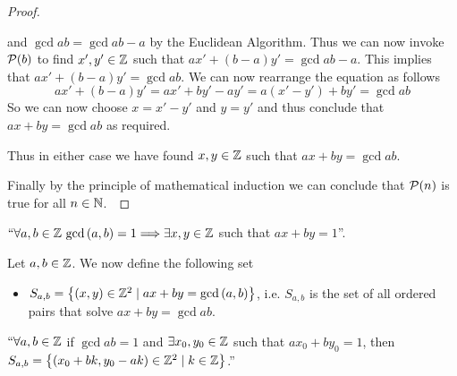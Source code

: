 \begin{proof}
\begin{itemize}
\begin{itemize}
                            and $\gcd{a}{b} = \gcd{a}{b - a}$ by the Euclidean Algorithm. Thus we can now invoke
                            $\mathcal{P}(b)$ to find $x', y' \in \mathbb{Z}$ such that 
                            $ax' + (b - a)y' = \gcd{a}{b - a}$.
                            This implies that $ax' + (b - a)y' = \gcd{a}{b}$. We can now rearrange the equation
                            as follows
                            \[
                                ax' + (b - a)y' = ax' + by' - ay' = a(x' - y') + by' = \gcd{a}{b}
                            \]
                            So we can now choose $x = x' - y'$ and $y = y'$ and thus conclude that 
                            $ax + by = \gcd{a}{b}$ as required.
                    \end{itemize}
                    Thus in either case we have found $x, y \in \mathbb{Z}$ such that $ax + by = \gcd{a}{b}$.
            \end{itemize}
            Finally by the principle of mathematical induction we can conclude that $\mathcal{P}(n)$ is
            true for all $n \in \mathbb{N}$.~\QED
        \end{proof}
        \begin{corollary}
            $``\forall a, b \in \mathbb{Z} \ \mathrm{gcd}\left(a, b\right) = 1 \Longrightarrow \exists x, y \in \mathbb{Z}$ such
            that $ax + by = 1$''.
            \label{diophantine inverse}
        \end{corollary}
        \begin{definition}
            Let $a, b \in \mathbb{Z}$. We now define the following set
            \begin{itemize}
                \item
                    $S_{a, b} = \left\{(x, y) \in \mathbb{Z}^2 \mid ax + by = \mathrm{gcd}\left(a, b\right)\right\}$, i.e. $S_{a, b}$ is
                    the set of all ordered pairs that solve $ax + by = \gcd{a}{b}$.
            \end{itemize}
        \end{definition}
        \begin{lemma}
            $``\forall a, b \in \mathbb{Z}$ if $\gcd{a}{b} = 1$ and $\exists x_0, y_0 \in \mathbb{Z}$
            such that $ax_0 + by_0 = 1$, then 
            $S_{a, b} = \left\{(x_0 + bk, y_0 - ak) \in \mathbb{Z}^2 \mid k \in \mathbb{Z}\right\}$.''
            \label{Linear Diophantine Equations All Solutions Lemma}
        \end{lemma}
